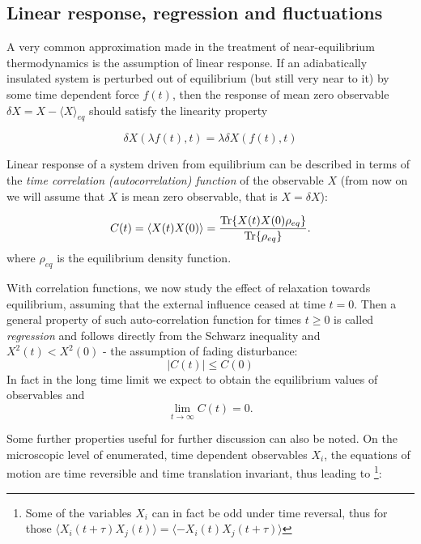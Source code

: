 \documentclass[a4paper,12pt]{article}
\begin{document}
\subsection{Linear response, regression and fluctuations}

A very common approximation made in the treatment of near-equilibrium thermodynamics is the assumption of linear response. If an adiabatically insulated system is perturbed out of equilibrium (but still very near to it) by some time dependent force $f(t)$, then the response of mean zero observable $\delta X= X-\langle X \rangle_{eq}$  should satisfy the linearity property

\begin{equation}
\label{LiearityProperty}
  \delta X(\lambda f(t),t) = \lambda \delta X(f(t),t)
\end{equation}

Linear response of a system driven from equilibrium can be described in terms of the \textit{time correlation (autocorrelation) function} of the observable $X$ (from now on we will assume that $X$ is mean zero observable, that is $X=\delta X$):
 
\begin{equation}
  C(t)=\langle X(t)X(0) \rangle = \frac{\Tr{X(t)X(0)\rho_{eq}}}{\Tr{\rho_{eq}}}.
\end{equation}
where $\rho_{eq}$ is the equilibrium density function.

With correlation functions, we now study the effect of relaxation towards equilibrium, assuming that the external influence ceased at time $t=0$.
Then a general property of such auto-correlation function for times $t\geq 0$ is called \textit{regression} and follows directly from the Schwarz inequality and $X^2(t)<X^2(0)$ - the assumption of fading disturbance:
\begin{equation}
 | C(t) | \leq C(0)
\end{equation}
In fact in the long time limit we expect to obtain the equilibrium values of observables and
\begin{equation}
  \lim_{t \to \infty} C(t)=0.
\end{equation}

Some further properties useful for further discussion can also be noted.
On the microscopic level of enumerated, time dependent observables $X_i$, the equations of motion are time reversible and time translation invariant\cite{Anonymous:vN0-ttAB}, thus leading to
\footnote{Some of the variables $X_i$ can in fact be odd under time reversal, thus for those $\langle X_i(t+\tau) X_j(t) \rangle = \langle -X_i(t) X_j(t+\tau) \rangle$}:
\end{document}

